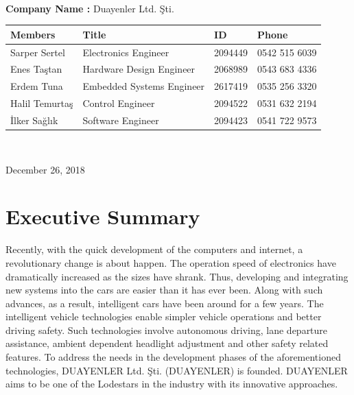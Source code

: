 \documentclass[a4paper,12pt]{article}
\begin{document}
\begin{titlepage}
\begin{minipage}[r]{0.35\textwidth}
		\end{minipage}\\[1cm]
		\begin{minipage}{\textwidth}
			\begin{flushleft}
				\large{\textbf{Company Name :}}	Duayenler Ltd. Şti.\\
				\begin{table}[H]
					\begin{tabular}{l l l l}
						\hline
						\textbf{Members} & \textbf{Title}            & \textbf{ID} & \textbf{Phone} \\ \hline
						Sarper Sertel    & Electronics Engineer      & 2094449     & 0542 515 6039  \\ 
						Enes Taştan     & Hardware Design Engineer  & 2068989     & 0543 683 4336  \\ 
						Erdem Tuna       & Embedded Systems Engineer & 2617419     & 0535 256 3320  \\ 
						Halil Temurtaş  & Control Engineer          & 2094522     & 0531 632 2194  \\
						İlker Sağlık  & Software Engineer         & 2094423     & 0541 722 9573  \\ \hline
						
						
					\end{tabular}
				\end{table}
			\end{flushleft}
		\end{minipage}\\[1cm]
		
		\begin{flushbottom}
			{\large December 26, 2018} %
		\end{flushbottom}
		
	\end{titlepage}
	
	\tableofcontents
	\newpage
	
	\section{Executive Summary}
	Recently, with the quick development of the computers and internet, a revolutionary change is about happen. The operation speed of electronics have dramatically increased as the sizes have shrank. Thus, developing and integrating new systems into the cars are easier than it has ever been. Along with such advances, as a result, intelligent cars have been around for a few years. The intelligent vehicle technologies enable simpler vehicle operations and better driving safety. Such technologies involve autonomous driving, lane departure assistance, ambient dependent headlight adjustment and other safety related features. To address the needs in the development phases of the aforementioned technologies, DUAYENLER Ltd. Şti. (DUAYENLER) is founded. DUAYENLER aims to be one of the Lodestars in the industry with its innovative approaches.\\
	
\end{document}
